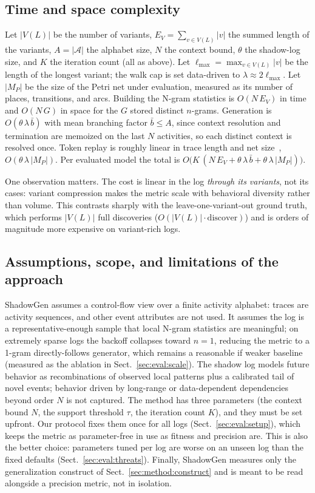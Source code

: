 \documentclass[runningheads]{llncs}
\begin{document}
\subsection{Time and space complexity}
\label{sec:method:complexity}
Let $|V(L)|$ be the number of variants, $E_V=\sum_{v\in V(L)}|v|$ the summed length of the variants, $A=|\mathcal{A}|$ the alphabet size, $N$ the context bound, $\theta$ the shadow-log size, and $K$ the iteration count (all as above). Let $\ell_{\max}=\max_{v\in V(L)}|v|$ be the length of the longest variant; the walk cap is set data-driven to $\lambda\approx2\ell_{\max}$. Let $|M_P|$ be the size of the Petri net under evaluation, measured as its number of places, transitions, and arcs. Building the N-gram statistics is $O(N\,E_V)$ in time and $O(N\,G)$ in space for the $G$ stored distinct $n$-grams. Generation is $O(\theta\,\lambda\,\bar b)$ with mean branching factor $\bar b\le A$, since context resolution and termination are memoized on the last $N$ activities, so each distinct context is resolved once. Token replay is roughly linear in trace length and net size~\cite{rozinat2008conformance}, $O(\theta\,\lambda\,|M_P|)$. Per evaluated model the total is $O\!\big(K\,(N\,E_V + \theta\,\lambda\,\bar b + \theta\,\lambda\,|M_P|)\big)$.

One observation matters. The cost is linear in the log \emph{through its variants}, not its cases: variant compression makes the metric scale with behavioral diversity rather than volume. This contrasts sharply with the leave-one-variant-out ground truth, which performs $|V(L)|$ full discoveries ($O(|V(L)|\cdot\mathrm{discover})$) and is orders of magnitude more expensive on variant-rich logs.

\subsection{Assumptions, scope, and limitations of the approach}
\label{sec:method:scope}
ShadowGen assumes a control-flow view over a finite activity alphabet: traces are activity sequences, and other event attributes are not used. It assumes the log is a representative-enough sample that local N-gram statistics are meaningful; on extremely sparse logs the backoff collapses toward $n{=}1$, reducing the metric to a 1-gram directly-follows generator, which remains a reasonable if weaker baseline (measured as the ablation in Sect.~\ref{sec:eval:scale}). The shadow log models future behavior as recombinations of observed local patterns plus a calibrated tail of novel events; behavior driven by long-range or data-dependent dependencies beyond order $N$ is not captured. The method has three parameters (the context bound $N$, the support threshold $\tau$, the iteration count $K$), and they must be set upfront. Our protocol fixes them once for all logs (Sect.~\ref{sec:eval:setup}), which keeps the metric as parameter-free in use as fitness and precision are. This is also the better choice: parameters tuned per log are worse on an unseen log than the fixed defaults (Sect.~\ref{sec:eval:threats}). Finally, ShadowGen measures only the generalization construct of Sect.~\ref{sec:method:construct} and is meant to be read alongside a precision metric, not in isolation.
\end{document}
